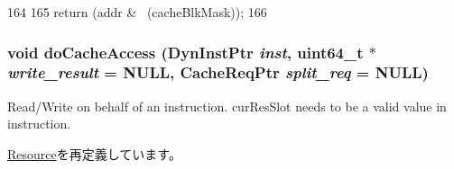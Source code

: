 \begin{DoxyCode}
164     {
165         return (addr & ~(cacheBlkMask));
166     }
\end{DoxyCode}
\hypertarget{classCacheUnit_afc4f09d8e36072c3a3c361f2edf108b4}{
\subsubsection[{doCacheAccess}]{\setlength{\rightskip}{0pt plus 5cm}void doCacheAccess ({\bf DynInstPtr} {\em inst}, \/  uint64\_\-t $\ast$ {\em write\_\-result} = {\ttfamily NULL}, \/  {\bf CacheReqPtr} {\em split\_\-req} = {\ttfamily NULL})}}
\label{classCacheUnit_afc4f09d8e36072c3a3c361f2edf108b4}
Read/Write on behalf of an instruction. curResSlot needs to be a valid value in instruction. 

\hyperlink{classResource_aa874bbb279acf67627511df8f4c3dce5}{Resource}を再定義しています。


